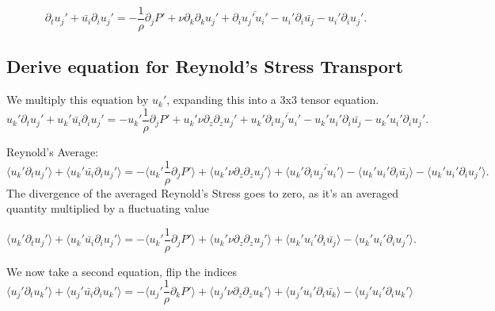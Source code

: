 \documentclass[
  letterpaper,
  DIV=11,
  numbers=noendperiod]{scrartcl}
\begin{document}
\begin{equation}
     \partial_t u_j' + \bar{u_i} \partial_i u_j'  =  - \frac{1}{\rho} \partial_j P'  +\nu \partial_k \partial_k u_j' + \partial_i \overline{u_j'u_i'} - u_i' \partial_i \bar{u_j}  - u_i' \partial_i u_j'  . 
\end{equation}

\subsection{Derive equation for Reynold's Stress Transport}

We multiply this equation by \(u_k'\), expanding this into a 3x3 tensor
equation. \begin{equation}
     u_k' \partial_t u_j' + u_k' \bar{u_i} \partial_i u_j'  =  - u_k' \frac{1}{\rho} \partial_j P'  + u_k' \nu \partial_z \partial_z u_j' + u_k' \partial_i \overline{u_j'u_i'} - u_k' u_i' \partial_i \bar{u_j}  - u_k' u_i' \partial_i u_j'  . 
\end{equation}

Reynold's Average: \begin{equation}
     \langle u_k' \partial_t u_j' \rangle  +
     \langle u_k' \bar{u_i} \partial_i u_j' \rangle  =  
      - \langle u_k' \frac{1}{\rho} \partial_j P' \rangle + 
     \langle u_k' \nu \partial_z \partial_z u_j' \rangle  + 
     \langle u_k' \partial_i \overline{u_j'u_i'} \rangle - 
     \langle u_k' u_i' \partial_i \bar{u_j} \rangle - 
     \langle u_k' u_i' \partial_i u_j' \rangle . 
\end{equation} The divergence of the averaged Reynold's Stress goes to
zero, as it's an averaged quantity multiplied by a fluctuating value

\begin{equation}
     \langle u_k' \partial_t u_j' \rangle  +
     \langle u_k' \bar{u_i} \partial_i u_j' \rangle  =  
      - \langle u_k' \frac{1}{\rho} \partial_j P' \rangle + 
     \langle u_k' \nu \partial_z \partial_z u_j' \rangle  + 
     \langle u_k' u_i' \partial_i \bar{u_j} \rangle - 
     \langle u_k' u_i' \partial_i u_j' \rangle . 
\end{equation}

We now take a second equation, flip the indices \begin{equation}
     \langle u_j' \partial_t u_k' \rangle  +
     \langle u_j' \bar{u_i} \partial_i u_k' \rangle  =  
      - \langle u_j' \frac{1}{\rho} \partial_k P' \rangle + 
     \langle u_j' \nu \partial_z \partial_z u_k' \rangle  + 
     \langle u_j' u_i' \partial_i \bar{u_k} \rangle - 
     \langle u_j' u_i' \partial_i u_k' \rangle 
\end{equation}
\end{document}
